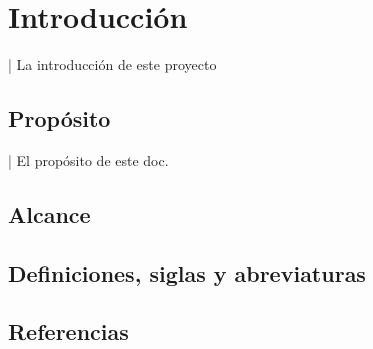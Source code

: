 \chapter{Introducción}
| La introducción de este proyecto

\section{Propósito}
| El propósito de este doc.
\section{Alcance}

\section{Definiciones, siglas y abreviaturas}

\section{Referencias}